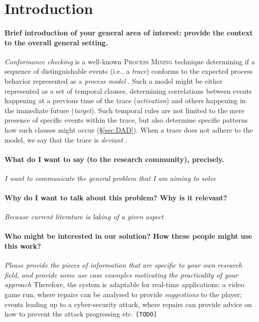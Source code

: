 \section{Introduction}

\paragraph*{Brief introduction of your general area of interest: provide the \textbf{context} to the overall general setting.}
\textit{Conformance checking} is a well-known \textsc{Process Mining} technique determining if a sequence of distinguishable events (i.e., a \textit{trace}) conforms to the expected process behavior represented as a \textit{process model} \cite{RozinatA08}. Such a model might be either represented as a set of temporal clauses, determining correlations between events happening at a previous time of the trace (\textit{activation}) and others happening in the immediate future (\textit{target}). Such temporal rules are not limited to the mere presence of specific events within the trace, but also determine specific patterns how such clauses might occur (\S\ref{sec:DAD}). When a trace does not adhere to the model, we say that the trace is \textit{deviant} \cite{bpm21}.
\medskip

\paragraph*{What do I want to say (to the research community), precisely.} \textit{I want to communicate the general problem that I am aiming to solve}
\medskip

\paragraph*{Why do I want to talk about this problem? Why is it relevant?} \textit{Because current literature is laking of a given aspect}
\medskip

\paragraph*{Who might be interested in our solution? How these people might use this work?} \textit{Please provide the pieces of information that are specific to your own research field, and provide some use case examples motivating the practicality of your approach} Therefore, the system is adaptable for real-time applications: a video game run, where repairs can be analysed to provide \emph{suggestions} to the player; events leading up to a cyber-security attack, where repairs can provide advice on how to prevent the attack progressing etc. \texttt{\color{red}[TODO]}
\medskip


